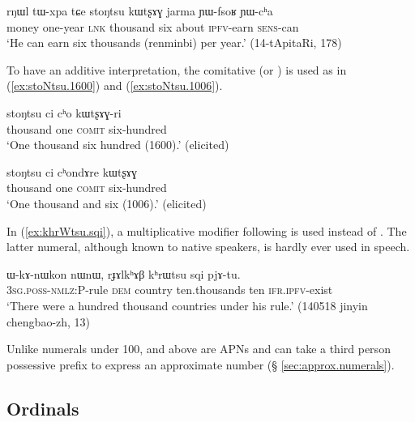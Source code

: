 \begin{exe}
\ex  \label{ex:stoNtsu.kWtsxAG}
 \gll   rŋɯl tɯ-xpa tɕe stoŋtsu kɯtʂɤɣ jarma ɲɯ-fsoʁ ɲɯ-cʰa \\
 money one-year \textsc{lnk} thousand six about \textsc{ipfv}-earn \textsc{sens}-can \\
 \glt `He can earn six thousands (renminbi) per year.' (14-tApitaRi, 178)
\end{exe}
  
 To have an additive interpretation, the comitative  (or ) is used as in (\ref{ex:stoNtsu.1600}) and (\ref{ex:stoNtsu.1006}).
 
\begin{exe}
\ex  \label{ex:stoNtsu.1600}
\gll  stoŋtsu ci cʰo kɯtʂɤɣ-ri \\
 thousand one \textsc{comit} six-hundred \\
\glt `One thousand six hundred (1600).' (elicited)
\end{exe}
  
\begin{exe}
\ex  \label{ex:stoNtsu.1006}
\gll  stoŋtsu ci cʰondɤre kɯtʂɤɣ \\
 thousand one \textsc{comit} six-hundred \\
\glt `One thousand and six (1006).' (elicited)
\end{exe}

In (\ref{ex:khrWtsu.sqi}), a multiplicative modifier  following  is used instead of . The latter numeral, although known to native speakers, is hardly ever used in speech.

\begin{exe}
\ex  \label{ex:khrWtsu.sqi}
\gll ɯ-kɤ-nɯkon nɯnɯ, rɟɤlkʰɤβ kʰrɯtsu sqi pjɤ-tu. \\
 \textsc{3sg}.\textsc{poss}-\textsc{nmlz}:P-rule \textsc{dem} country ten.thousands ten \textsc{ifr}.\textsc{ipfv}-exist \\
\glt `There were a hundred thousand countries under his rule.' (140518 jinyin chengbao-zh, 13)
\end{exe} 


 
Unlike numerals under 100,  and above are APNs and can take a third person possessive prefix  to express an approximate number (§ \ref{sec:approx.numerals}).

 \subsection{Ordinals} \label{sec:ordinals}
 
